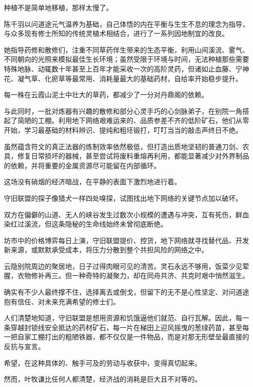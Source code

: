 种植不是简单地移植，那样太慢了。

陈千羽以问道途元气温养为基础，自己体悟的内在平衡与生生不息的理念为指导，与众多现有修士所知的传统灵植术相结合，进行了一系列因地制宜的改良。

她指导药修和散修们，注重不同草药伴生带来的生态平衡，利用山间溪流、雾气、不同朝向的光照来模拟最佳生长环境；虽然受限于环境与时间，无法种植那些需要特殊地脉、动辄数十年甚至上百年才能采收一次的高阶灵药，但诸如止血藤、宁神花、凝气草、化瘀草等最常用、消耗量最大的基础药材，自给率开始稳步提升。

每一株在云霞山泥土中壮大的草药，都减少了一分对丹鼎阁的依赖。

与此同时，一批对炼器有兴趣的散修和部分心灵手巧的心剑脉弟子，在别院一角搭起了简陋的工棚。利用地下网络艰难运来的、品质参差不齐的低阶矿石，他们从零开始，学习最基础的材料辨识、提纯和粗坯锻打，叮叮当当的敲击声终日不绝。

虽然蕴含符文的真正法器的炼制效率依然极低，但打造出质地坚韧的普通刀剑、农具，修复日常损坏的器械，甚至尝试将废料重熔再利用，都能显著减少对外界制品的依赖，并将重要的金属资源尽可能留在内部循环。

\vspace{2em}

这场没有硝烟的经济暗战，在平静的表面下激烈地进行着。

守旧联盟的探子像猎犬一样四处嗅探，试图找出地下网络的关键节点加以破坏。

双方在偏僻的山道、无人的峡谷发生过数次小规模的遭遇与冲突，互有死伤，鲜血染红过溪流，但这条隐秘的生命线始终未曾彻底断绝。

坊市中的价格博弈每日上演，守旧联盟提价、控货，地下网络就寻找替代品、开发新来源，或默默承受成本，将压力分散到整个共担风险的网络之中。

云隐别院周边的聚居地，日子过得肉眼可见的清苦。灵石永远不够用，饭菜少见荤腥，衣物修补再三。但一种奇特的凝聚力，却在同舟共济、共克时艰中悄然滋生。

确实有不少人最终撑不住，选择离去或倒戈，但留下的无不是心性坚定、对问道途抱有信任、对未来充满希望的修士们。

人们清楚地知道，守旧联盟是想用资源和饥饿逼他们就范、自行瓦解。因此，每一条穿越封锁线安全抵达的药材矿石，每一片在梯田上迎风摇曳的葱绿药苗，甚至每一把自家工棚打出的粗陋铁器，都不仅仅是一件物品，而是对那无形壁垒最直接的反抗与宣言。

希望，在这种具体的、触手可及的劳动与收获中，变得真切起来。

然而，叶牧谦比任何人都清楚，经济战的消耗是巨大且不对等的。


